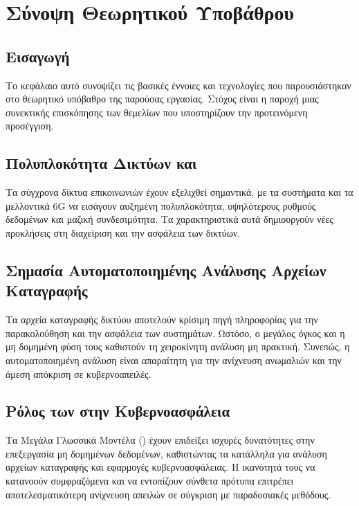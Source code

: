 \section{Σύνοψη Θεωρητικού Υποβάθρου}

\subsection{Εισαγωγή}

Το κεφάλαιο αυτό συνοψίζει τις βασικές έννοιες και τεχνολογίες που παρουσιάστηκαν στο θεωρητικό υπόβαθρο της παρούσας εργασίας. Στόχος είναι η παροχή μιας συνεκτικής επισκόπησης των θεμελίων που υποστηρίζουν την προτεινόμενη προσέγγιση.

\subsection{Πολυπλοκότητα Δικτύων  και }

Τα σύγχρονα δίκτυα επικοινωνιών έχουν εξελιχθεί σημαντικά, με τα συστήματα  και τα μελλοντικά 6G να εισάγουν αυξημένη πολυπλοκότητα, υψηλότερους ρυθμούς δεδομένων και μαζική συνδεσιμότητα. Τα χαρακτηριστικά αυτά δημιουργούν νέες προκλήσεις στη διαχείριση και την ασφάλεια των δικτύων.

\subsection{Σημασία Αυτοματοποιημένης Ανάλυσης Αρχείων Καταγραφής}

Τα αρχεία καταγραφής δικτύου αποτελούν κρίσιμη πηγή πληροφορίας για την παρακολούθηση και την ασφάλεια των συστημάτων. Ωστόσο, ο μεγάλος όγκος και η μη δομημένη φύση τους καθιστούν τη χειροκίνητη ανάλυση μη πρακτική. Συνεπώς, η αυτοματοποιημένη ανάλυση είναι απαραίτητη για την ανίχνευση ανωμαλιών και την άμεση απόκριση σε κυβερνοαπειλές.

\subsection{Ρόλος των  στην Κυβερνοασφάλεια}

Τα Μεγάλα Γλωσσικά Μοντέλα () έχουν επιδείξει ισχυρές δυνατότητες στην επεξεργασία μη δομημένων δεδομένων, καθιστώντας τα κατάλληλα για ανάλυση αρχείων καταγραφής και εφαρμογές κυβερνοασφάλειας. Η ικανότητά τους να κατανοούν συμφραζόμενα και να εντοπίζουν σύνθετα πρότυπα επιτρέπει αποτελεσματικότερη ανίχνευση απειλών σε σύγκριση με παραδοσιακές μεθόδους.


